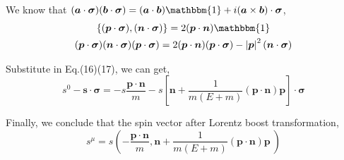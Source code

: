\documentclass[a4paper]{article}
\begin{document}
\par We know that $(\boldsymbol{a}\cdot\boldsymbol{\sigma})(\boldsymbol{b}\cdot\boldsymbol{\sigma})=(\boldsymbol{a}\cdot\boldsymbol{b})\mathbbm{1}+i(\boldsymbol{a}\times\boldsymbol{b})\cdot\boldsymbol{\sigma}$, 
\begin{gather}
    \left\{(\boldsymbol{p}\cdot\boldsymbol{\sigma}),(\boldsymbol{n}\cdot\boldsymbol{\sigma})\right\}=2(\boldsymbol{p}\cdot\boldsymbol{n})\mathbbm{1} \\
    (\boldsymbol{p}\cdot\boldsymbol{\sigma})(\boldsymbol{n}\cdot\boldsymbol{\sigma})(\boldsymbol{p}\cdot\boldsymbol{\sigma})=2(\boldsymbol{p}\cdot\boldsymbol{n})(\boldsymbol{p}\cdot\boldsymbol{\sigma})-\left|\boldsymbol{p}\right|^2(\boldsymbol{n}\cdot\boldsymbol{\sigma})
\end{gather}
\par Substitute in Eq.(16)(17), we can get, 
\begin{equation}
     s^{0}-\boldsymbol{s}\cdot\boldsymbol{\sigma}=-s\frac{\boldsymbol{p}\cdot\boldsymbol{n}}{m}-s[\boldsymbol{n}+\frac{1}{m(E+m)}(\boldsymbol{p}\cdot\boldsymbol{n})\boldsymbol{p}]\cdot\boldsymbol{\sigma}
\end{equation}
\par Finally, we conclude that the spin vector after Lorentz boost transformation, 
\begin{equation}
    s^{\mu}=s(-\frac{\boldsymbol{p}\cdot\boldsymbol{n}}{m},\boldsymbol{n}+\frac{1}{m(E+m)}(\boldsymbol{p}\cdot\boldsymbol{n})\boldsymbol{p} \ )
\end{equation}
\end{document}
